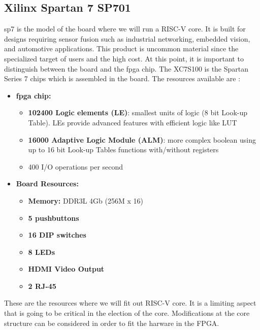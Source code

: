 \subsection{Xilinx Spartan 7 SP701} \label{sec:fpga}
\gls{sp7} is the model of the board where we will run a RISC-V core. It is built for designs requiring sensor fusion such as industrial networking, embedded vision, and automotive applications. This product is uncommon material since the specialized target of users and the high cost. At this point, it is important to distinguish between the board and the \gls{fpga} chip. The XC7S100 is the Spartan Series 7 chips which is assembled in the board. The resources available are \cite{xilinxsp}:  

\begin{itemize}
	\item \textbf{\gls{fpga} chip:}
	\begin{itemize}
		\item \textbf{102400 Logic elements (LE)}: smallest units of logic (8 bit Look-up Table). LEs  provide advanced features with efficient logic like LUT
	   	\item \textbf{16000 Adaptive Logic Module (ALM)}: more complex boolean using up to 16 bit Look-up Tables functions with/without registers
	    	\item 400 I/O operations per second %
	\end{itemize}
	\item \textbf{Board  Resources:}
	\begin{itemize}
		\item \textbf{Memory:} DDR3L 4Gb (256M x 16)
		\item \textbf{5 pushbuttons}
		\item \textbf{16 DIP switches}
		\item \textbf{8 LEDs}
		\item \textbf{HDMI Video Output}
		\item \textbf{2 RJ-45}
		
	\end{itemize}
\end{itemize}

These are the resources where we will fit out RISC-V core. It is a limiting aspect that is going to be critical in the election of the core. Modifications at the core structure can be considered in order to fit the harware in the FPGA. 





